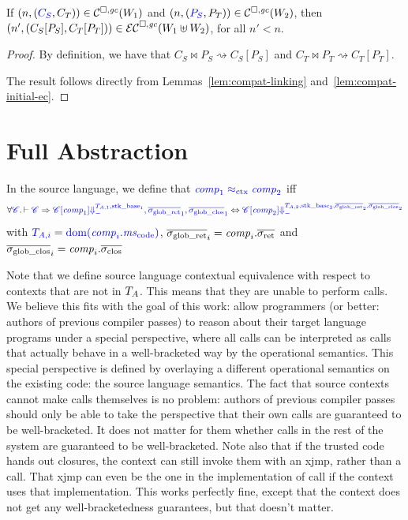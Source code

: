 \documentclass[a4paper]{article}
\begin{document}
\begin{lemma}
  \label{lem:compat-context-plug}
  If $\npair{\stpair{C}{C}}\in\lrcomp(W_1)$ and $\npair{\stpair{P}{P}} \in \lrcomp(W_2)$, then
  $\npair[n']{(\plug{C_S}{P_S},\plug{C_T}{P_T})} \in \lrec(W_1 \uplus W_2)$, for all $n' < n$.
\end{lemma}
\begin{proof}
  By definition, we have that $C_S \bowtie P_S \rightsquigarrow C_S[P_S]$ and $C_T \bowtie P_T \rightsquigarrow C_T[P_T]$.

  The result follows directly from Lemmas~\ref{lem:compat-linking} and~\ref{lem:compat-initial-ec}.
\end{proof}

\section{Full Abstraction}
\label{sec:full-abstraction}
\begin{definition}
  In the source language, we define that $\src{\var{comp}_1 \sconeq \var{comp}_2}$ iff
  \begin{equation*}
    \forall \src{\context} \ldotp \vdash \src{\context} \Rightarrow \src{\plug{\context}{\var{comp}_1} \sterm{\ta[,1],\stkb_1},\gsigrets_1,\gsigcloss_1} \Leftrightarrow \src{\plug{\context}{\var{comp}_2} \sterm{\ta[,2],\stkb_2,\gsigrets_2,\gsigcloss_2}}
  \end{equation*}
  with $\src{\ta[,i]} = \src{\dom(\var{comp}_i.\mscode)}$, $\gsigrets_i = \var{comp}_i.\sigrets$ and $\gsigcloss_i = \var{comp}_i.\sigcloss$
\end{definition}

Note that we define source language contextual equivalence with respect to contexts that are not in $\ta$.
This means that they are unable to perform calls.
We believe this fits with the goal of this work: allow programmers (or better: authors of previous compiler passes) to reason about their target language programs under a special perspective, where all calls can be interpreted as calls that actually behave in a well-bracketed way by the operational semantics.
This special perspective is defined by overlaying a different operational semantics on the existing code: the source language semantics.
The fact that source contexts cannot make calls themselves is no problem: authors of previous compiler passes should only be able to take the perspective that their own calls are guaranteed to be well-bracketed.
It does not matter for them whether calls in the rest of the system are guaranteed to be well-bracketed.
Note also that if the trusted code hands out closures, the context can still invoke them with an xjmp, rather than a call.
That xjmp can even be the one in the implementation of call if the context uses that implementation. 
This works perfectly fine, except that the context does not get any well-bracketedness guarantees, but that doesn't matter.
\end{document}
